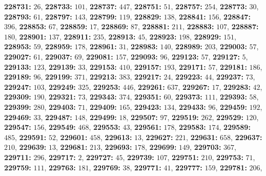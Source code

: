 \textsf{\bfseries 228731:} $26$, \textsf{\bfseries 228733:} $101$, \textsf{\bfseries 228737:} $447$, \textsf{\bfseries 228751:} $51$, \textsf{\bfseries 228757:} $254$, \textsf{\bfseries 228773:} $30$, \textsf{\bfseries 228793:} $61$, \textsf{\bfseries 228797:} $143$, \textsf{\bfseries 228799:} $119$, \textsf{\bfseries 228829:} $138$, \textsf{\bfseries 228841:} $156$, \textsf{\bfseries 228847:} $396$, \textsf{\bfseries 228853:} $67$, \textsf{\bfseries 228859:} $17$, \textsf{\bfseries 228869:} $87$, \textsf{\bfseries 228881:} $211$, \textsf{\bfseries 228883:} $107$, \textsf{\bfseries 228887:} $180$, \textsf{\bfseries 228901:} $137$, \textsf{\bfseries 228911:} $235$, \textsf{\bfseries 228913:} $45$, \textsf{\bfseries 228923:} $198$, \textsf{\bfseries 228929:} $151$, \textsf{\bfseries 228953:} $59$, \textsf{\bfseries 228959:} $178$, \textsf{\bfseries 228961:} $31$, \textsf{\bfseries 228983:} $140$, \textsf{\bfseries 228989:} $203$, \textsf{\bfseries 229003:} $57$, \textsf{\bfseries 229027:} $61$, \textsf{\bfseries 229037:} $69$, \textsf{\bfseries 229081:} $157$, \textsf{\bfseries 229093:} $96$, \textsf{\bfseries 229123:} $57$, \textsf{\bfseries 229127:} $5$, \textsf{\bfseries 229133:} $123$, \textsf{\bfseries 229139:} $33$, \textsf{\bfseries 229153:} $410$, \textsf{\bfseries 229157:} $193$, \textsf{\bfseries 229171:} $57$, \textsf{\bfseries 229181:} $186$, \textsf{\bfseries 229189:} $96$, \textsf{\bfseries 229199:} $371$, \textsf{\bfseries 229213:} $383$, \textsf{\bfseries 229217:} $24$, \textsf{\bfseries 229223:} $44$, \textsf{\bfseries 229237:} $73$, \textsf{\bfseries 229247:} $103$, \textsf{\bfseries 229249:} $325$, \textsf{\bfseries 229253:} $446$, \textsf{\bfseries 229261:} $637$, \textsf{\bfseries 229267:} $17$, \textsf{\bfseries 229283:} $42$, \textsf{\bfseries 229309:} $190$, \textsf{\bfseries 229321:} $73$, \textsf{\bfseries 229343:} $374$, \textsf{\bfseries 229351:} $60$, \textsf{\bfseries 229373:} $111$, \textsf{\bfseries 229393:} $58$, \textsf{\bfseries 229399:} $280$, \textsf{\bfseries 229403:} $71$, \textsf{\bfseries 229409:} $165$, \textsf{\bfseries 229423:} $134$, \textsf{\bfseries 229433:} $96$, \textsf{\bfseries 229459:} $192$, \textsf{\bfseries 229469:} $33$, \textsf{\bfseries 229487:} $148$, \textsf{\bfseries 229499:} $18$, \textsf{\bfseries 229507:} $97$, \textsf{\bfseries 229519:} $262$, \textsf{\bfseries 229529:} $120$, \textsf{\bfseries 229547:} $156$, \textsf{\bfseries 229549:} $468$, \textsf{\bfseries 229553:} $43$, \textsf{\bfseries 229561:} $178$, \textsf{\bfseries 229583:} $174$, \textsf{\bfseries 229589:} $485$, \textsf{\bfseries 229591:} $52$, \textsf{\bfseries 229601:} $458$, \textsf{\bfseries 229613:} $13$, \textsf{\bfseries 229627:} $221$, \textsf{\bfseries 229631:} $658$, \textsf{\bfseries 229637:} $210$, \textsf{\bfseries 229639:} $13$, \textsf{\bfseries 229681:} $213$, \textsf{\bfseries 229693:} $178$, \textsf{\bfseries 229699:} $149$, \textsf{\bfseries 229703:} $367$, \textsf{\bfseries 229711:} $296$, \textsf{\bfseries 229717:} $2$, \textsf{\bfseries 229727:} $45$, \textsf{\bfseries 229739:} $107$, \textsf{\bfseries 229751:} $210$, \textsf{\bfseries 229753:} $71$, \textsf{\bfseries 229759:} $111$, \textsf{\bfseries 229763:} $181$, \textsf{\bfseries 229769:} $38$, \textsf{\bfseries 229771:} $41$, \textsf{\bfseries 229777:} $159$, \textsf{\bfseries 229781:} $206$, 
